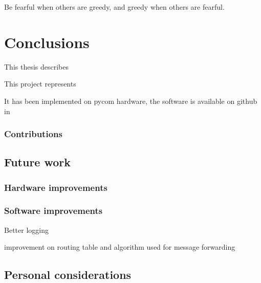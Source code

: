 
\begin{savequote}[70mm]
	Be fearful when others are greedy, and greedy when others are fearful.
\end{savequote}

\chapter{Conclusions}\label{ch:conclusions}

	This thesis describes 
	
	This project represents
	
	It has been implemented on pycom hardware, the software is available on github in 

	\subsection{Contributions}

	\section{Future work}
	
		\subsection{Hardware improvements}
			

		\subsection{Software improvements}
		
			Better logging 
			
			improvement on routing table and algorithm used for message forwarding 

	\section{Personal considerations}
	
